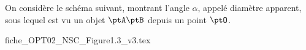 








\hauteurLargeurCadreReponse		{8mm}{2cm}
\typeEntrainement				{} %
\initialisationEntrainement


                                \initialisationPartieGauche %


On considère le schéma suivant, montrant l'angle $\alpha$, appelé diamètre apparent, sous lequel est vu un objet $\ptA\ptB$ depuis un point $\ptO$.

                                \initialisationPartieDroite %
\begin{center}
{fiche_OPT02_NSC_Figure1.3_v3.tex}
\end{center}
                               \finalisationDuPartageDePage %


